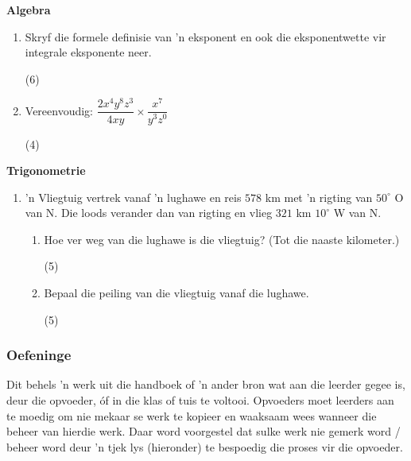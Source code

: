 \textbf{Algebra}
\begin{enumerate}[itemsep=0pt, label=\textbf{\arabic*}. ] 
\item Skryf die formele definisie van 'n eksponent en ook die eksponentwette vir integrale eksponente neer.\begin{flushright}(6)\end{flushright}
\item Vereenvoudig: $\dfrac{2x^4y^8z^3}{4xy} \times \dfrac{x^7}{y^3z^0}$	\begin{flushright}(4)\end{flushright}
\end{enumerate}

\textbf{Trigonometrie}
\begin{enumerate}[itemsep=0pt, label=\textbf{\arabic*}. ] 
\item
  'n Vliegtuig vertrek vanaf 'n lughawe en reis $578$ km met 'n
  rigting van $50^{\circ}$ O van N. Die loods verander dan van rigting
  en vlieg $321$ km $10^{\circ}$ W van N.
\begin{enumerate}[itemsep=0pt,label=\textbf{(\alph*)}]
\item Hoe ver weg van die lughawe is die vliegtuig? (Tot die naaste kilometer.) \begin{flushright}(5)\end{flushright}
\item Bepaal die peiling van die vliegtuig vanaf die lughawe.\begin{flushright}(5)\end{flushright}
\end{enumerate}
\end{enumerate}

\subsubsection{Oefeninge}
Dit behels 'n werk uit die handboek of 'n ander bron wat aan die leerder gegee is, deur die opvoeder, \'{o}f in die klas of tuis te voltooi. Opvoeders moet leerders aan te moedig om nie mekaar se werk te kopieer en waaksaam wees wanneer die beheer van hierdie werk. Daar word voorgestel dat sulke werk nie gemerk word / beheer word deur 'n tjek lys (hieronder) te bespoedig die proses vir die opvoeder.

